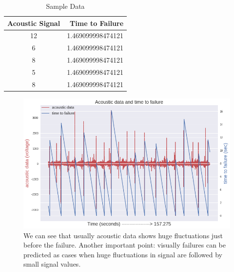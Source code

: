 \documentclass[]{llncs} %
\begin{document}
\begin{table}[h!]
	\begin{center}
		\caption{Sample Data}
		\label{tab:SampleData}
		\begin{tabular}{c|r} 
			\textbf{Acoustic Signal} & \textbf{Time to Failure}\\
			\hline
			12 & 1.469099998474121 \\ 
			6 & 1.469099998474121 \\ 
			8 & 1.469099998474121 \\ 
			5 & 1.469099998474121 \\ 
			8 & 1.469099998474121 \\ 
		\end{tabular}
	\end{center}
\end{table}

\begin{figure}[h!]
	\centering
	\includegraphics[width=01\linewidth]{timeSeries}
	\caption{We can see that usually acoustic data shows huge fluctuations just before the failure. Another important point: visually failures can be predicted as cases when huge fluctuations in signal are followed by small signal values.}
	\label{fig:timeseries}
\end{figure}
\end{document}
